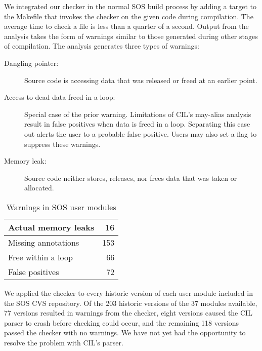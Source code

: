 We integrated our checker in the normal SOS build process by adding a
target to the Makefile that invokes the checker on the given code
during compilation.  The average time to check a file is less than a
quarter of a second.  Output from the analysis takes the form of
warnings similar to those generated during other stages of
compilation.
%
The analysis generates three types of warnings:
%
\begin{description}
%
\item[Dangling pointer:] Source code is accessing data that was
released or freed at an earlier point.
%
\item[Access to dead data freed in a loop:] Special case of the prior
warning.  Limitations of CIL's may-alias analysis result in false
positives when data is freed in a loop.  Separating this case out
alerts the user to a probable false positive.  Users may also set a
flag to suppress these warnings.
%
\item[Memory leak:] Source code neither stores, releases, nor frees
data that was taken or allocated.
%
%
\end{description}
%

\begin{table}
\caption{Warnings in SOS user modules}
%
\label{tab:module}
\centering 
\begin{tabular}{| l | r |}
    \hline 
    Actual memory leaks & 16 \\
    \hline
    Missing annotations & 153 \\
    \hline 
    Free within a loop & 66 \\
    \hline 
    False positives & 72 \\
    \hline 
\end{tabular} 
%
\end{table}

We applied the checker to every historic version of each user module
included in the SOS CVS repository.  Of the 203 historic versions of
the 37 modules available, 77 versions resulted in warnings from the
checker, eight versions caused the CIL parser to crash before checking
could occur, and the remaining 118 versions passed the checker with no
warnings.  We have not yet had the opportunity to resolve the problem
with CIL's parser.

